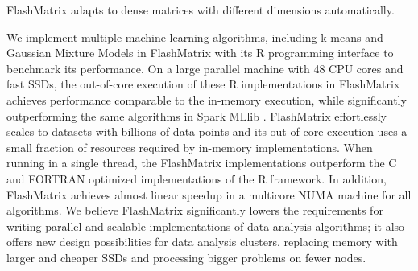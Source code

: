 FlashMatrix adapts to dense matrices with different dimensions automatically.



We implement multiple machine learning algorithms, including k-means \cite{kmeans}
and Gaussian Mixture Models \cite{gmm} in FlashMatrix with its R programming
interface to benchmark its performance. On a large parallel machine with 48
CPU cores and fast SSDs, the out-of-core execution of these R implementations
in FlashMatrix achieves performance comparable to the in-memory execution,
while significantly outperforming the same algorithms in Spark MLlib
\cite{spark}. FlashMatrix effortlessly scales to datasets with billions
of data points and its out-of-core execution uses a small fraction of
resources required by in-memory implementations. When
running in a single thread, the FlashMatrix implementations
outperform the C and FORTRAN optimized implementations of the R framework.
In addition, FlashMatrix achieves almost linear speedup in a multicore NUMA
machine for all algorithms. We believe
FlashMatrix significantly lowers the requirements for writing parallel
and scalable implementations of data analysis algorithms; it also offers new
design possibilities for data analysis clusters, replacing memory with larger
and cheaper SSDs and processing bigger problems on fewer nodes.
